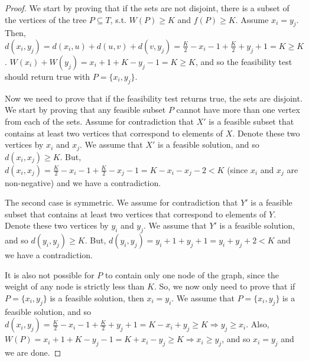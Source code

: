 \documentclass[11pt,a4paper]{article}
\theoremstyle{definition}
\theoremstyle{remark}
\begin{document}
\begin{proof}
We start by proving that if the sets are not disjoint, there is a subset of the vertices of the tree $P \subseteq T$, s.t. $W(P) \geq K$ and $f(P) \geq K$. Assume $x_i=y_j$. Then, $d(x_i,y_j) = d(x_i,u) + d(u,v) + d(v,y_j) = \frac{K}{2} - x_i -1 + \frac{K}{2} + y_j +1 = K \geq K$. $W(x_i) + W(y_j) = x_i + 1 + K- y_j -1 = K \geq K$, and so the feasibility test should return true with $P = \lbrace x_i, y_j \rbrace$.

Now we need to prove that if the feasibility test returns true, the sets are disjoint.
We start by proving that any feasible subset $P$ cannot have more than one vertex from each of the sets.
Assume for contradiction that $X'$ is a feasible subset that contains at least two vertices that correspond to elements of $X$. Denote these two vertices by $x_i$ and $x_j$. We assume that $X'$ is a feasible solution, and so $d(x_i,x_j) \geq K$. But, $d(x_i,x_j) = \frac{K}{2} - x_i -1 + \frac{K}{2} - x_j -1 = K - x_i - x_j -2 < K$ (since $x_i$ and $x_j$ are non-negative) and we have a contradiction.

The second case is symmetric. We assume for contradiction that $Y'$ is a feasible subset that contains at least two vertices that correspond to elements of $Y$. Denote these two vertices by $y_i$ and $y_j$. We assume that $Y'$ is a feasible solution, and so $d(y_i,y_j) \geq K$. But, $d(y_i,y_j) = y_i + 1 + y_j + 1 = y_i + y_j + 2 < K$ and we have a contradiction.

It is also not possible for $P$ to contain only one node of the graph, since the weight of any node is strictly less than $K$. So, we now only need to prove that if $P= \{ x_i,y_j \}$ is a feasible solution, then $x_i = y_i$. We assume that $P= \{ x_i,y_j \}$ is a feasible solution, and so $d(x_i,y_j) = \frac{K}{2} - x_i -1 + \frac{K}{2} + y_j +1 = K - x_i + y_j \geq K \Rightarrow y_j \geq x_i$. Also, $W(P) = x_i + 1 + K - y_j -1 = K + x_i - y_j \geq K \Rightarrow x_i \geq y_j$, and so $x_i = y_j$ and we are done.
\end{proof}




\end{document}
